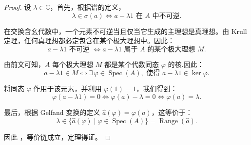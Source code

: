 \documentclass{ctexart}
\theoremstyle{plain}
\newtheorem*{proof}{证明}
\theoremstyle{plain}
\DeclareMathOperator{\Spec}{Spec}
\begin{document}
\begin{proof}
    设 $\lambda \in \mathbb{C}$，首先，根据谱的定义，
    \begin{equation*}
        \lambda \in \sigma(a) \Longleftrightarrow a - \lambda 1 \text{ 在 } A \text{ 中不可逆}.
    \end{equation*}
    
    在交换含幺代数中，一个元素不可逆当且仅当它生成的主理想是真理想。由 Krull 定理，任何真理想都必定包含在某个极大理想中。因此：
    \begin{equation*}
        a - \lambda 1 \text{ 不可逆 } \Longleftrightarrow a - \lambda 1 \text{ 属于 } A \text{ 的某个极大理想 } M.
    \end{equation*}

    由前文可知，$A$ 每个极大理想 $M$ 都是某个代数同态 $\varphi$ 的核.因此：
    \begin{equation*}
        a - \lambda 1 \in M \Longleftrightarrow \exists\, \varphi \in \Spec(A), \text{ 使得 } a - \lambda 1 \in \ker\varphi.
    \end{equation*}

    将同态 $\varphi$ 作用于该元素，并利用 $\varphi(1) = 1$，我们得到：
    \begin{equation*}
        \varphi(a - \lambda 1) = 0 \Longleftrightarrow \varphi(a) - \lambda = 0 \Longleftrightarrow \varphi(a) = \lambda.
    \end{equation*}

    最后，根据 Gelfand 变换的定义 $\widehat{a}(\varphi) = \varphi(a)$，这等价于：
    \begin{equation*}
        \lambda \in \{\widehat{a}(\varphi) \mid \varphi \in \Spec(A)\} = \operatorname{Range}(\widehat{a}).
    \end{equation*}
    
    因此 ，等价链成立，定理得证。
\end{proof}
\end{document}
